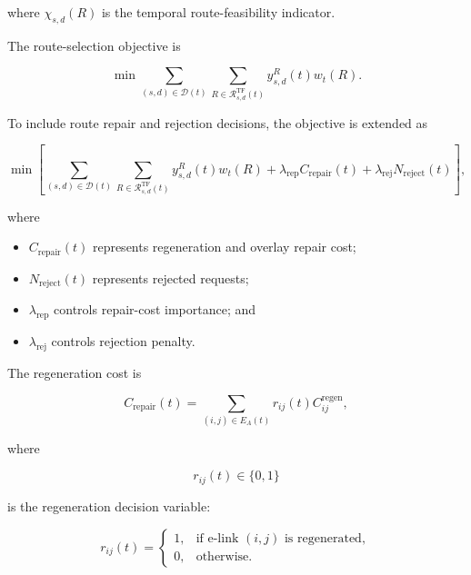 where $\chi_{s,d}(R)$ is the temporal route-feasibility indicator.


The route-selection objective is

\begin{equation}
    \min
    \sum_{(s,d)\in\mathcal{D}(t)}
    \sum_{R\in\mathcal{R}_{s,d}^{\mathrm{TF}}(t)}
    y_{s,d}^{R}(t)
    w_t(R).
\end{equation}


To include route repair and rejection decisions, the objective is extended as

\begin{equation}
\min
\left[
\sum_{(s,d)\in\mathcal{D}(t)}
\sum_{R\in\mathcal{R}_{s,d}^{\mathrm{TF}}(t)}
y_{s,d}^{R}(t)w_t(R)
+
\lambda_{\mathrm{rep}}
C_{\mathrm{repair}}(t)
+
\lambda_{\mathrm{rej}}
N_{\mathrm{reject}}(t)
\right],
\end{equation}

where

\begin{itemize}
    \item $C_{\mathrm{repair}}(t)$ represents regeneration and overlay repair cost;
    \item $N_{\mathrm{reject}}(t)$ represents rejected requests;
    \item $\lambda_{\mathrm{rep}}$ controls repair-cost importance; and
    \item $\lambda_{\mathrm{rej}}$ controls rejection penalty.
\end{itemize}


The regeneration cost is

\begin{equation}
    C_{\mathrm{repair}}(t)
    =
    \sum_{(i,j)\in E_A(t)}
    r_{ij}(t)
    C_{ij}^{\mathrm{regen}},
\end{equation}

where

\begin{equation}
    r_{ij}(t)\in\{0,1\}
\end{equation}

is the regeneration decision variable:

\begin{equation}
    r_{ij}(t)
    =
    \begin{cases}
    1, & \text{if e-link $(i,j)$ is regenerated},\\
    0, & \text{otherwise}.
    \end{cases}
\end{equation}


